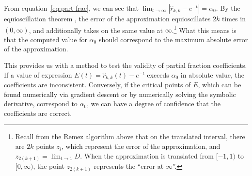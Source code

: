 From equation~\ref{eq:part-frac}, we can see that
$\lim_{t\to\infty}{\left|\hat{r}_{k,k} - e^{-t}\right|} = \alpha_0$. By the
equioscillation theorem , the error of the approximation equioscillates $2k$ times
in $(0, \infty)$, and additionally takes on the same value at $\infty$.\footnote{Recall
from the Remez algorithm above that on the translated interval, there are $2k$
points $z_i$, which represent the error of the approximation, and
$z_{2(k+1)}=\lim_{t\to 1}{D}$. When the approximation is translated from $[-1,
1)$ to $[0, \infty)$, the point $z_{2(k + 1)}$ represents the ``error at
$\infty$''.} What this means is that the computed value for $\alpha_0$ should
correspond to the maximum absolute error of the approximation.

This provides us with a method to test the validity of partial fraction
coefficients. If a value of expression $E(t) = \hat{r}_{k,k}(t) - e^{-t}$
exceeds $\alpha_0$ in absolute value, the coefficients are inconsistent.
Conversely, if the critical points of $E$, which can be found numerically via
gradient descent or by numerically solving the symbolic derivative, correspond
to $\alpha_0$, we can have a degree of confidence that the coefficients are
correct.

